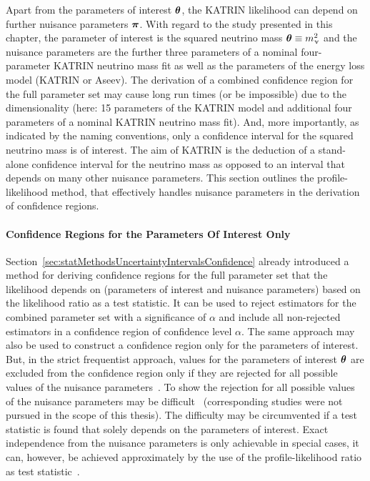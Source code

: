 Apart from the parameters of interest $\boldsymbol{\mathbf{\theta}}$, the KATRIN likelihood can depend on further nuisance parameters $\boldsymbol{\mathbf{\pi}}$. With regard to the study presented in this chapter, the parameter of interest is the squared neutrino mass $\boldsymbol{\mathbf{\theta}}\equiv m_\upnu^2$ and the nuisance parameters are the further three parameters of a nominal four-parameter KATRIN neutrino mass fit as well as the parameters of the energy loss model (KATRIN or Aseev). The derivation of a combined confidence region for the full parameter set may cause long run times (or be impossible) due to the dimensionality (here: 15 parameters of the KATRIN model and additional four parameters of a nominal KATRIN neutrino mass fit). And, more importantly, as indicated by the naming conventions, only a confidence interval for the squared neutrino mass is of interest. The aim of KATRIN is the deduction of a stand-alone confidence interval for the neutrino mass as opposed to an interval that depends on many other nuisance parameters. This section outlines the profile-likelihood method, that effectively handles nuisance parameters in the derivation of confidence regions.

\paragraph{Confidence Regions for the Parameters Of Interest Only}
Section~\ref{sec:statMethodsUncertaintyIntervalsConfidence} already introduced a method for deriving confidence regions for the full parameter set that the likelihood depends on (parameters of interest and nuisance parameters) based on the likelihood ratio as a test statistic. It can be used to reject estimators for the combined parameter set with a significance of $\alpha$ and include all non-rejected estimators in a confidence region of confidence level $\alpha$. The same approach may also be used to construct a confidence region only for the parameters of interest. But, in the strict frequentist approach, values for the parameters of interest $\boldsymbol{\mathbf{\theta}}$ are excluded from the confidence region only if they are rejected for all possible values of the nuisance parameters~\cite{ReviewOfParticlePhysics}. To show the rejection for all possible values of the nuisance parameters may be difficult~\cite{ReviewOfParticlePhysics} (corresponding studies were not pursued in the scope of this thesis). The difficulty may be circumvented if a test statistic is found that solely depends on the parameters of interest. Exact independence from the nuisance parameters is only achievable in special cases, it can, however, be achieved approximately by the use of the profile-likelihood ratio as test statistic~\cite{ReviewOfParticlePhysics}.

